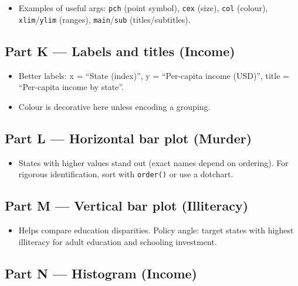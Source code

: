 \documentclass[
  letterpaper,
  DIV=11,
  numbers=noendperiod]{scrreprt}
\providecommand{\tightlist}{%
  \setlength{\itemsep}{0pt}\setlength{\parskip}{0pt}}
\begin{document}
\begin{itemize}
\tightlist
\item
  Examples of useful args: \texttt{pch} (point symbol), \texttt{cex}
  (size), \texttt{col} (colour), \texttt{xlim}/\texttt{ylim} (ranges),
  \texttt{main}/\texttt{sub} (titles/subtitles).
\end{itemize}

\subsection{Part K --- Labels and titles
(Income)}\label{part-k-labels-and-titles-income}

\begin{itemize}
\tightlist
\item
  Better labels: x = ``State (index)'', y = ``Per-capita income (USD)'',
  title = ``Per-capita income by state''.\\
\item
  Colour is decorative here unless encoding a grouping.
\end{itemize}

\subsection{Part L --- Horizontal bar plot
(Murder)}\label{part-l-horizontal-bar-plot-murder}

\begin{itemize}
\tightlist
\item
  States with higher values stand out (exact names depend on ordering).
  For rigorous identification, sort with \texttt{order()} or use a
  dotchart.
\end{itemize}

\subsection{Part M --- Vertical bar plot
(Illiteracy)}\label{part-m-vertical-bar-plot-illiteracy}

\begin{itemize}
\tightlist
\item
  Helps compare education disparities. Policy angle: target states with
  highest illiteracy for adult education and schooling investment.
\end{itemize}

\subsection{Part N --- Histogram
(Income)}\label{part-n-histogram-income}
\end{document}
